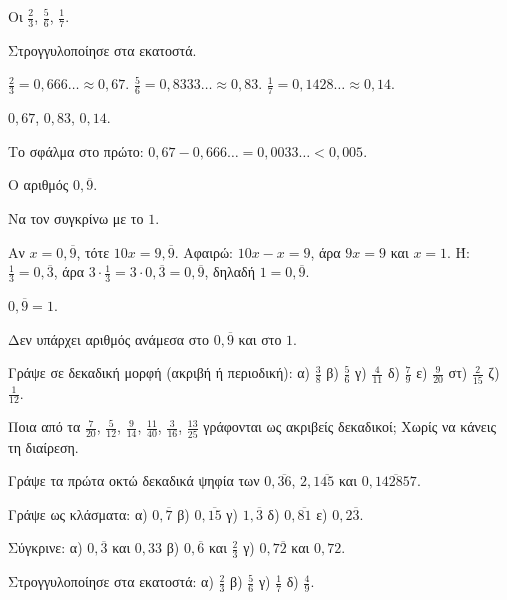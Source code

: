 \tixero Οι $\frac{2}{3}$, $\frac{5}{6}$, $\frac{1}{7}$.\par
\tithelo Στρογγυλοποίησε στα εκατοστά.\par
\possindeo $\frac{2}{3}=0{,}666\ldots\approx0{,}67$. $\frac{5}{6}=0{,}8333\ldots\approx0{,}83$. $\frac{1}{7}=0{,}1428\ldots\approx0{,}14$.\par
\apantisi $0{,}67$, $0{,}83$, $0{,}14$.\par
\elegxos Το σφάλμα στο πρώτο: $0{,}67-0{,}666\ldots=0{,}0033\ldots<0{,}005$.

\tixero Ο αριθμός $0{,}\overline{9}$.\par
\tithelo Να τον συγκρίνω με το $1$.\par
\possindeo Αν $x=0{,}\overline{9}$, τότε $10x=9{,}\overline{9}$. Αφαιρώ: $10x-x=9$, άρα $9x=9$ και $x=1$. Ή: $\frac{1}{3}=0{,}\overline{3}$, άρα $3\cdot\frac{1}{3}=3\cdot0{,}\overline{3}=0{,}\overline{9}$, δηλαδή $1=0{,}\overline{9}$.\par
\apantisi $0{,}\overline{9}=1$.\par
\elegxos Δεν υπάρχει αριθμός ανάμεσα στο $0{,}\overline{9}$ και στο $1$.



\ex Γράψε σε δεκαδική μορφή (ακριβή ή περιοδική): α) $\frac{3}{8}$ \quad β) $\frac{5}{6}$ \quad γ) $\frac{4}{11}$ \quad δ) $\frac{7}{9}$ \quad ε) $\frac{9}{20}$ \quad στ) $\frac{2}{15}$ \quad ζ) $\frac{1}{12}$.

\ex Ποια από τα $\frac{7}{20}$, $\frac{5}{12}$, $\frac{9}{14}$, $\frac{11}{40}$, $\frac{3}{16}$, $\frac{13}{25}$ γράφονται ως ακριβείς δεκαδικοί; Χωρίς να κάνεις τη διαίρεση.

\ex Γράψε τα πρώτα οκτώ δεκαδικά ψηφία των $0{,}\overline{36}$, $2{,}1\overline{45}$ και $0{,}\overline{142857}$.

\ex Γράψε ως κλάσματα: α) $0{,}\overline{7}$ \quad β) $0{,}\overline{15}$ \quad γ) $1{,}\overline{3}$ \quad δ) $0{,}\overline{81}$ \quad ε) $0{,}2\overline{3}$.

\ex Σύγκρινε: α) $0{,}\overline{3}$ και $0{,}33$ \quad β) $0{,}\overline{6}$ και $\frac{2}{3}$ \quad γ) $0{,}7\overline{2}$ και $0{,}72$.

\ex Στρογγυλοποίησε στα εκατοστά: α) $\frac{2}{3}$ \quad β) $\frac{5}{6}$ \quad γ) $\frac{1}{7}$ \quad δ) $\frac{4}{9}$.


